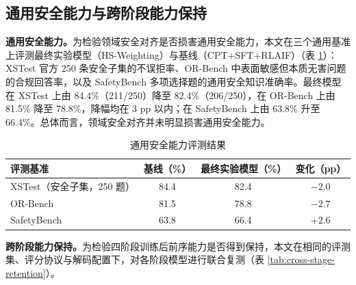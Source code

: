 \documentclass[fontset=fandol,type=master,campus=shenzhen,etitleauto=true]{hithesisbook}
\begin{document}
\subsection{通用安全能力与跨阶段能力保持}\label{cross-stage-retention}

\textbf{通用安全能力。}为检验领域安全对齐是否损害通用安全能力，本文在三个通用基准上评测最终实验模型（HS-Weighting）与基线（CPT+SFT+RLAIF）（表 \ref{tab:general-safety}）：XSTest\cite{ref49} 官方 250 条安全子集的不误拒率、OR-Bench\cite{ref50} 中表面敏感但本质无害问题的合规回答率，以及 SafetyBench\cite{ref87} 多项选择题的通用安全知识准确率。最终模型在 XSTest 上由 84.4\%（211/250）降至 82.4\%（206/250），在 OR-Bench 上由 81.5\% 降至 78.8\%，降幅均在 3 pp 以内；在 SafetyBench 上由 63.8\% 升至 66.4\%。总体而言，领域安全对齐并未明显损害通用安全能力。

\begin{table}[htbp]
\centering
\caption{通用安全能力评测结果}
\label{tab:general-safety}
\small
\renewcommand{\arraystretch}{1.15}
\begin{tabular}{l c c c}
\toprule
\textbf{评测基准} & \textbf{基线（\%）} & \textbf{最终实验模型（\%）} & \textbf{变化（pp）} \\
\midrule
XSTest（安全子集，250 题） & 84.4 & 82.4 & $-2.0$ \\
OR-Bench & 81.5 & 78.8 & $-2.7$ \\
SafetyBench & 63.8 & 66.4 & $+2.6$ \\
\bottomrule
\end{tabular}
\end{table}

\textbf{跨阶段能力保持。}为检验四阶段训练后前序能力是否得到保持，本文在相同的评测集、评分协议与解码配置下，对各阶段模型进行联合复测（表 \ref{tab:cross-stage-retention}）。
\end{document}
